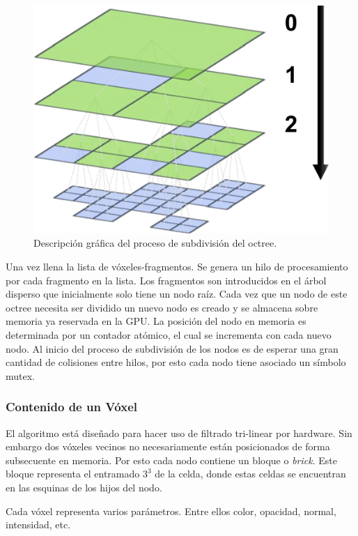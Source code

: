 \begin{figure}
	\includegraphics[width=0.95\linewidth]{media/miplevels.png}
	\caption{Descripción gráfica del proceso de subdivisión del octree.}
	\label{fig:miplevels}
\end{figure}

Una vez llena la lista de vóxeles-fragmentos. Se genera un hilo de procesamiento por cada fragmento en la lista. Los fragmentos son introducidos en el árbol disperso que inicialmente solo tiene un nodo raíz. Cada vez que un nodo de este octree necesita ser dividido un nuevo nodo es creado y se almacena sobre memoria ya reservada en la \ac{GPU}. La posición del nodo en memoria es determinada por un contador atómico, el cual se incrementa con cada nuevo nodo. Al inicio del proceso de subdivisión de los nodos es de esperar una gran cantidad de colisiones entre hilos, por esto cada nodo tiene asociado un símbolo mutex.

\subsubsection{Contenido de un Vóxel}
\label{subsub:voxelcontent_orig}

El algoritmo está diseñado para hacer uso de filtrado tri-linear por hardware. Sin embargo dos vóxeles vecinos no necesariamente están posicionados de forma subsecuente en memoria. Por esto cada nodo contiene un bloque o \emph{brick}. Este bloque representa el entramado $3^3$ de la celda, donde estas celdas se encuentran en las esquinas de los hijos del nodo.

Cada vóxel representa varios parámetros. Entre ellos color, opacidad, normal, intensidad, etc.

